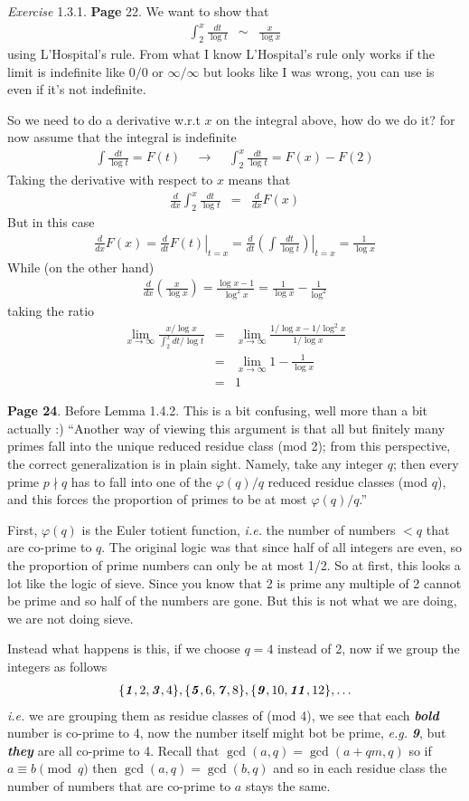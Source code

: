 \documentclass[aps,preprint,preprintnumbers,nofootinbib,showpacs,prd]{revtex4-1}
\newcommand{\ie}{{\it i.e.} }
\newcommand{\eg}{{\it e.g.} }
\newcommand{\nbea}{\begin{eqnarray*}}
\newcommand{\neea}{\end{eqnarray*}}
\begin{document}
{\it Exercise } 1.3.1. {\bf Page} 22. We want to show that
%
\nbea
\int_2^x \frac{dt}{\log t} & \sim & \frac{x}{\log x}
\neea
%
using L'Hospital's rule. From what I know L'Hospital's rule only works if the limit is indefinite like $0/0$ or $\infty/\infty$ but looks like I was wrong, you can use is even if it's not indefinite.

So we need to do a derivative w.r.t $x$ on the integral above, how do we do it? for now assume that the integral is indefinite
%
\nbea
\int \frac{dt}{\log t} = F(t) ~~~~~ \longrightarrow ~~~~~ \int_2^x \frac{dt}{\log t} = F(x) - F(2)
\neea
%
Taking the derivative with respect to $x$ means that
%
\nbea
\frac{d}{dx} \int_2^x \frac{dt}{\log t} & = & \frac{d}{dx} F(x)
\neea
%
But in this case
%
\nbea
\frac{d}{dx} F(x) = \left.\frac{d}{dt}F(t) \right|_{t = x} = \left.\frac{d}{dt}\left(\int \frac{dt}{\log t}\right) \right|_{t = x} = \frac{1}{\log x}
\neea
%
While (on the other hand)
%
\nbea
\frac{d}{dx} \left ( \frac{x}{\log x} \right )  = \frac{\log x - 1}{\log^2 x} = \frac{1}{\log x} - \frac{1}{\log^2}
\neea
%
taking the ratio
%
\nbea
\lim_{x\to\infty} \frac{x/\log x}{\int_2^x dt/\log t} & = & \lim_{x\to\infty} \frac{1/\log x - 1/\log^2x}{1/\log x} \\
& = & \lim_{x\to\infty} 1 - \frac{1}{\log x} \\
& = & 1
\neea
%

{\bf Page 24}. Before Lemma 1.4.2. This is a bit confusing, well more than a bit actually :) ``Another way of viewing this argument is that all but finitely many primes fall into the unique reduced residue class (mod 2); from this perspective, the correct generalization is in plain sight. Namely, take any integer $q$; then every prime $p \nmid q$ has to fall into one of the $\varphi(q)/q$ reduced residue classes (mod $q$), and this forces the proportion of primes to be at most $\varphi(q)/q$.''

First, $\varphi(q)$ is the Euler totient function, \ie the number of numbers $< q$ that are co-prime to $q$. The original logic was that since half of all integers are even, so the proportion of prime numbers can only be at most 1/2. So at first, this looks a lot like the logic of sieve. Since you know that 2 is prime any multiple of 2 cannot be prime and so half of the numbers are gone. But this is not what we are doing, we are not doing sieve.

Instead what happens is this, if we choose $q=4$ instead of 2, now if we group the integers as follows
%
\nbea
\{\textbf{\textit 1},2,\textbf{\textit 3},4\},\{\textbf{\textit 5},6,\textbf{\textit {7}},8\},\{\textbf{\textit 9},10,\textbf{\textit {11}},12\}, \dots
\neea
%
\ie we are grouping them as residue classes of (mod 4), we see that each \textbf{\textit{bold}} number is co-prime to 4, now the number itself might bot be prime, \eg \textbf{\textit{9}}, but \textbf{\textit{they}} are all co-prime to 4. Recall that $\gcd(a, q) = \gcd(a + qm, q)$ so if $a \equiv b \pmod{q}$ then $\gcd(a,q) = \gcd(b,q)$ and so in each residue class the number of numbers that are co-prime to $a$ stays the same.
\end{document}
